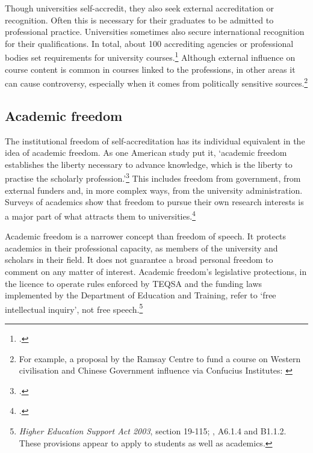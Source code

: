 \documentclass{grattan}
\begin{document}
Though universities self-accredit, they also seek external accreditation or recognition. Often this is necessary for their graduates to be admitted to professional practice. Universities sometimes also secure international recognition for their qualifications. In total, about 100 accrediting agencies or professional bodies set requirements for university courses.\footcite[][appendix~1]{PhillipsKPA2017professionalaccred} Although external influence on course content is common in courses linked to the professions, in other areas it can cause controversy, especially when it comes from politically sensitive sources.\footnote{For example, a proposal by the Ramsay Centre to fund a course on Western civilisation and Chinese Government influence via Confucius Institutes: \textcites[][]{Bongiorno2018theriseandfallo}[][]{Haines2018novetoorcontrol}[][chapter~10.]{Hamilton2018silentinvasionch}}

%
\subsection{Academic freedom}\label{subsec:academic-freedom}

The institutional freedom of self-accreditation has its individual equivalent in the idea of academic freedom. As one American study put it, `academic freedom establishes the liberty necessary to advance knowledge, which is the liberty to practise the scholarly profession.'\footcite[][39]{Finkin2009forthecommongood} This includes freedom from government, from external funders and, in more complex ways, from the university administration. Surveys of academics show that freedom to pursue their own research interests is a major part of what attracts them to universities.\footcite[][66]{Bexley2011theaustralianacad}

Academic freedom is a narrower concept than freedom of speech. It protects academics in their professional capacity, as members of the university and scholars in their field. It does not guarantee a broad personal freedom to comment on any matter of interest. Academic freedom's legislative protections, in the licence to operate rules enforced by TEQSA and the funding laws implemented by the Department of Education and Training, refer to `free intellectual inquiry', not free speech.\footnote{\emph{Higher Education Support Act 2003}, section 19-115; \textcite[][]{DepartmentofEducationandTraining2015highereducationre}, A6.1.4 and B1.1.2. These provisions appear to apply to students as well as academics.}
\end{document}
